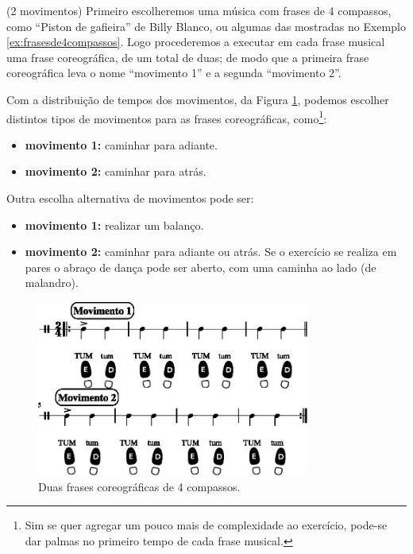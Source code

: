 \begin{example}
\label{ex:usandofrases1}
(2 movimentos)
Primeiro escolheremos uma música com frases de 4 compassos, como ``Piston de gafieira'' de Billy Blanco,
ou algumas das mostradas no Exemplo \ref{ex:frasesde4compassos}.
Logo procederemos a executar em cada frase musical uma frase coreográfica, de um total de duas;
de modo que a primeira frase coreográfica leva o nome ``movimento 1'' e a segunda ``movimento 2''.

Com a distribuição de tempos dos movimentos, da Figura \ref{fig:frasecoreografica0}, 
podemos escolher distintos tipos de movimentos para as frases coreográficas, 
como\footnote{Sim 
se quer agregar um pouco mais de complexidade ao exercício,
pode-se dar palmas no primeiro tempo de cada frase musical.}:
\begin{itemize}
\item \textbf{movimento 1:} caminhar para adiante.
\item \textbf{movimento 2:} caminhar para atrás.
\end{itemize}
Outra  escolha alternativa de movimentos pode ser:
\begin{itemize}
\item \textbf{movimento 1:} realizar um balanço.
\item \textbf{movimento 2:} caminhar para adiante ou atrás. 
Se o exercício se realiza em pares o abraço de dança pode ser aberto, 
com uma caminha ao lado (de malandro). 
\end{itemize}
\end{example}


\begin{figure}[!h]
    \centering
    \includegraphics[width=0.8\textwidth]{chapters/cap-musicalidade/treino-fraseio0-1.eps}
    \caption{Duas frases coreográficas de 4 compassos.}
    \label{fig:frasecoreografica0}
\end{figure}

